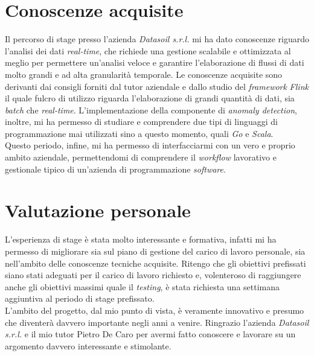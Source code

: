 \section{Conoscenze acquisite}
Il percorso di stage presso l'azienda \textit{Datasoil s.r.l.} mi ha dato conoscenze riguardo l'analisi dei dati \textit{real-time}, che richiede una gestione scalabile e ottimizzata al meglio per permettere un'analisi veloce e garantire l'elaborazione di flussi di dati molto grandi e ad alta granularità temporale. Le conoscenze acquisite sono derivanti dai consigli forniti dal tutor aziendale e dallo studio del \textit{\textit{\gls{framework}}} \textit{Flink} il quale fulcro di utilizzo riguarda l'elaborazione di grandi quantità di dati, sia \textit{batch} che \textit{real-time}. L'implementazione della componente di \textit{anomaly detection}, inoltre, mi ha permesso di studiare e comprendere due tipi di linguaggi di programmazione mai utilizzati sino a questo momento, quali \textit{Go} e \textit{Scala}.\\
Questo periodo, infine, mi ha permesso di interfacciarmi con un vero e proprio ambito aziendale, permettendomi di comprendere il \textit{workflow} lavorativo e gestionale tipico di un'azienda di programmazione \textit{software}.

\section{Valutazione personale}
L'esperienza di stage è stata molto interessante e formativa, infatti mi ha permesso di migliorare sia sul piano di gestione del carico di lavoro personale, sia nell'ambito delle conoscenze tecniche acquisite. Ritengo che gli obiettivi prefissati siano stati adeguati per il carico di lavoro richiesto e, volenteroso di raggiungere anche gli obiettivi massimi quale il \textit{testing}, è stata richiesta una settimana aggiuntiva al periodo di stage prefissato.\\
L'ambito del progetto, dal mio punto di vista, è veramente innovativo e presumo che diventerà davvero importante negli anni a venire. Ringrazio l'azienda \textit{Datasoil s.r.l.} e il mio tutor Pietro De Caro per avermi fatto conoscere e lavorare su un argomento davvero interessante e stimolante. 
